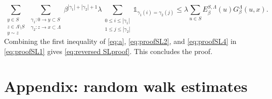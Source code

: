 \documentclass[11pt,a4paper]{article}
\numberwithin{equation}{section}
\theoremstyle{plain}
\theoremstyle{definition}
\begin{document}
\begin{equation}\label{eq:proofSL4}
	\sum_{\substack{y\in S\\ z\in \Lambda\setminus S\\ y\sim z}}\sum_{\substack{\gamma_1:0\rightarrow y\subset S\\\gamma_2:z\rightarrow x\subset \Lambda}}\beta^{|\gamma_1|+|\gamma_2|+1}\lambda \sum_{\substack{0\leq i \leq |\gamma_1|\\1\leq j \leq |\gamma_2|}}\mathds{1}_{\gamma_1(i)=\gamma_2(j)}\leq \lambda \sum_{u\in S}E_\beta^{S,\Lambda}(u)G_\beta^\Lambda(u,x).
\end{equation}
Combining the first inequality of \eqref{eq:a}, \eqref{eq:proofSL2}, and \eqref{eq:proofSL4} in \eqref{eq:proofSL1} gives \eqref{eq:reversed SLproof}. This concludes the proof.

\section{Appendix: random walk estimates}\label{appendix:rw estimates}
\end{document}
